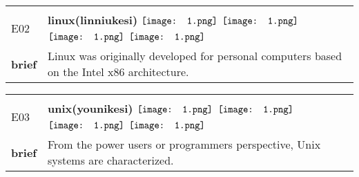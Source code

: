 \documentclass[UTF8]{article}
\begin{document}
            \begin{tabularx}{\textwidth}{p{1.5cm}X}
            \arrayrulecolor{myBlue}
        	\hline\\
            \small{E02}&
            \large{\bfseries{linux(linniukesi)}}\hfill
                                                            \phantom{$\vcenter{\hbox{\texttt{[image: 1.png]}}}$}
                                                                \phantom{$\vcenter{\hbox{\texttt{[image: 1.png]}}}$}
                                                                $\vcenter{\hbox{\texttt{[image: 1.png]}}}$
                                                                $\vcenter{\hbox{\texttt{[image: 1.png]}}}$
                                                                \phantom{$\vcenter{\hbox{\texttt{[image: 1.png]}}}$}
                                                                $\vcenter{\hbox{\texttt{[image: 1.png]}}}$
                                                                $\vcenter{\hbox{\texttt{[image: 1.png]}}}$
                                        \\[10pt]
            \large{\bfseries{brief}}&\noindent\parbox[c]{\hsize}{Linux was originally developed for personal computers based on the Intel x86 architecture.} \\[5pt]
            \hline\\[-10pt]
        \end{tabularx}
            \begin{tabularx}{\textwidth}{p{1.5cm}X}
            \arrayrulecolor{myBlue}
        	\hline\\
            \small{E03}&
            \large{\bfseries{unix(younikesi)}}\hfill
                                                            \phantom{$\vcenter{\hbox{\texttt{[image: 1.png]}}}$}
                                                                \phantom{$\vcenter{\hbox{\texttt{[image: 1.png]}}}$}
                                                                $\vcenter{\hbox{\texttt{[image: 1.png]}}}$
                                                                $\vcenter{\hbox{\texttt{[image: 1.png]}}}$
                                                                \phantom{$\vcenter{\hbox{\texttt{[image: 1.png]}}}$}
                                                                $\vcenter{\hbox{\texttt{[image: 1.png]}}}$
                                                                $\vcenter{\hbox{\texttt{[image: 1.png]}}}$
                                        \\[10pt]
            \large{\bfseries{brief}}&\noindent\parbox[c]{\hsize}{From the power users or programmers perspective, Unix systems are characterized.} \\[5pt]
            \hline\\[-10pt]
        \end{tabularx}
\end{document}
